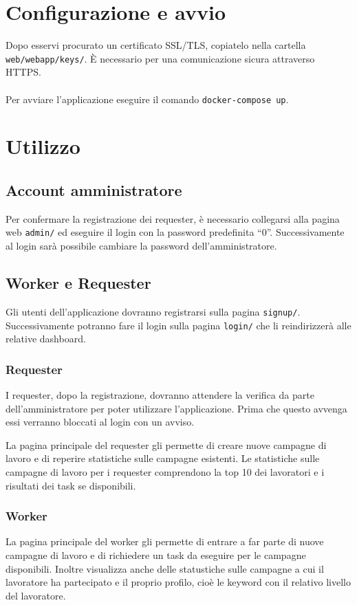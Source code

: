 \documentclass[a4paper]{article}
\begin{document}
\section{Configurazione e avvio}
Dopo esservi procurato un certificato SSL/TLS, copiatelo nella cartella \verb|web/webapp/keys/|. \`E necessario per una comunicazione sicura attraverso HTTPS.\\\\
Per avviare l'applicazione eseguire il comando \verb|docker-compose up|.

\section{Utilizzo}
\subsection{Account amministratore}
Per confermare la registrazione dei requester, \`e necessario collegarsi alla pagina web \verb|admin/| ed eseguire il login con la password predefinita  ``$0$''. Successivamente al login sar\`a possibile cambiare la password dell'amministratore.

\subsection{Worker e Requester}
Gli utenti dell'applicazione dovranno registrarsi sulla pagina \verb|signup/|.
Successivamente potranno fare il login sulla pagina \verb|login/| che li reindirizzer\`a alle relative dashboard.

\subsubsection{Requester}
I requester, dopo la registrazione, dovranno attendere la verifica da parte dell'amministratore per poter utilizzare l'applicazione. Prima che questo avvenga essi verranno bloccati al login con un avviso.

La pagina principale del requester gli permette di creare nuove campagne di lavoro e di reperire statistiche sulle campagne esistenti.
Le statistiche sulle campagne di lavoro per i requester comprendono la top 10 dei lavoratori e i risultati dei task se disponibili.

\subsubsection{Worker}
La pagina principale del worker gli permette di entrare a far parte di nuove campagne di lavoro e di richiedere un task da eseguire per le campagne disponibili.
Inoltre visualizza anche delle statustiche sulle campagne a cui il lavoratore ha partecipato e il proprio profilo, cio\`e le keyword con il relativo livello del lavoratore.
\end{document}
